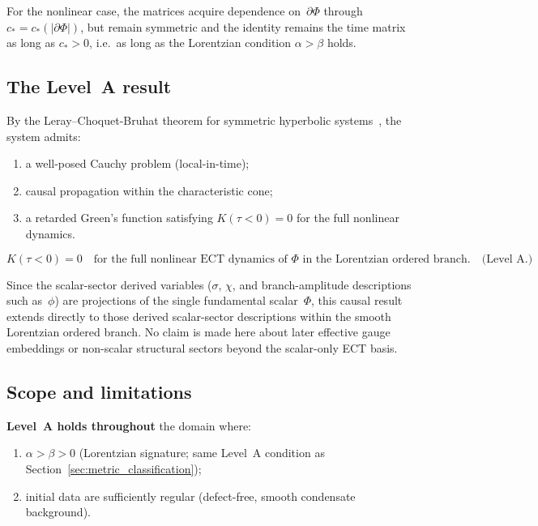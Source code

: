\documentclass[11pt,a4paper]{article}
\numberwithin{equation}{section}
\begin{document}
For the nonlinear case, the matrices acquire dependence on~$\partial\Phi$
through $c_* = c_*(|\partial\Phi|)$, but remain symmetric and the
identity remains the time matrix as long as $c_*>0$, i.e.\ as long as
the Lorentzian condition $\alpha>\beta$ holds.

\subsection*{The Level~A result}

By the Leray--Choquet-Bruhat theorem for symmetric hyperbolic
systems~\cite{Leray1952,ChoquetBruhat1952}, the system admits:
\begin{enumerate}
  \item a well-posed Cauchy problem (local-in-time);
  \item causal propagation within the characteristic cone;
  \item a retarded Green's function satisfying
    $K(\tau<0)=0$ for the full nonlinear dynamics.
\end{enumerate}

\begin{equation}
  \boxed{K(\tau<0)=0 \quad \text{for the full nonlinear ECT dynamics of }
  \Phi \text{ in the Lorentzian ordered branch.} \quad\text{(Level~A.)}}
  \label{eq:K_full_levelA}
\end{equation}

Since the scalar-sector derived variables ($\sigma$, $\chi$, and
branch-amplitude descriptions such as~$\phi$) are projections of the
single fundamental scalar~$\Phi$, this causal result extends directly
to those derived scalar-sector descriptions within the smooth Lorentzian
ordered branch.
No claim is made here about later effective gauge embeddings or
non-scalar structural sectors beyond the scalar-only ECT basis.

\subsection*{Scope and limitations}

\textbf{Level~A holds throughout} the domain where:
\begin{enumerate}
  \item $\alpha>\beta>0$ (Lorentzian signature; same Level~A condition
    as Section~\ref{sec:metric_classification});
  \item initial data are sufficiently regular (defect-free, smooth
    condensate background).
\end{enumerate}
\end{document}
